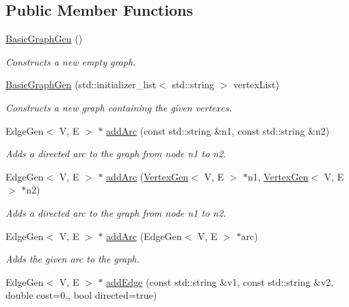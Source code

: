\subsection*{Public Member Functions}
\begin{DoxyCompactItemize}
\item 
\mbox{\hyperlink{classBasicGraphGen_a9d6eaee0a2e8ea6de432f815463813fa}{Basic\+Graph\+Gen}} ()
\begin{DoxyCompactList}\small\item\em Constructs a new empty graph. \end{DoxyCompactList}\item 
\mbox{\hyperlink{classBasicGraphGen_aa8af075f69d803e4a813e4d348150fc5}{Basic\+Graph\+Gen}} (std\+::initializer\+\_\+list$<$ std\+::string $>$ vertex\+List)
\begin{DoxyCompactList}\small\item\em Constructs a new graph containing the given vertexes. \end{DoxyCompactList}\item 
Edge\+Gen$<$ V, E $>$ $\ast$ \mbox{\hyperlink{classGraph_aad2e9fedd7110ae2fb6873c5e2d29941}{add\+Arc}} (const std\+::string \&n1, const std\+::string \&n2)
\begin{DoxyCompactList}\small\item\em Adds a directed arc to the graph from node n1 to n2. \end{DoxyCompactList}\item 
Edge\+Gen$<$ V, E $>$ $\ast$ \mbox{\hyperlink{classGraph_a7280d3cd76bab82df392ba91ed5257c6}{add\+Arc}} (\mbox{\hyperlink{classVertexGen}{Vertex\+Gen}}$<$ V, E $>$ $\ast$n1, \mbox{\hyperlink{classVertexGen}{Vertex\+Gen}}$<$ V, E $>$ $\ast$n2)
\begin{DoxyCompactList}\small\item\em Adds a directed arc to the graph from node n1 to n2. \end{DoxyCompactList}\item 
Edge\+Gen$<$ V, E $>$ $\ast$ \mbox{\hyperlink{classGraph_aa1b6553e579c03260253a2d731668dfa}{add\+Arc}} (Edge\+Gen$<$ V, E $>$ $\ast$arc)
\begin{DoxyCompactList}\small\item\em Adds the given arc to the graph. \end{DoxyCompactList}\item 
Edge\+Gen$<$ V, E $>$ $\ast$ \mbox{\hyperlink{classBasicGraphGen_a624c45bedf3986073b0f8a40ab4d85c2}{add\+Edge}} (const std\+::string \&v1, const std\+::string \&v2, double cost=0., bool directed=true)

\end{DoxyCompactItemize}
